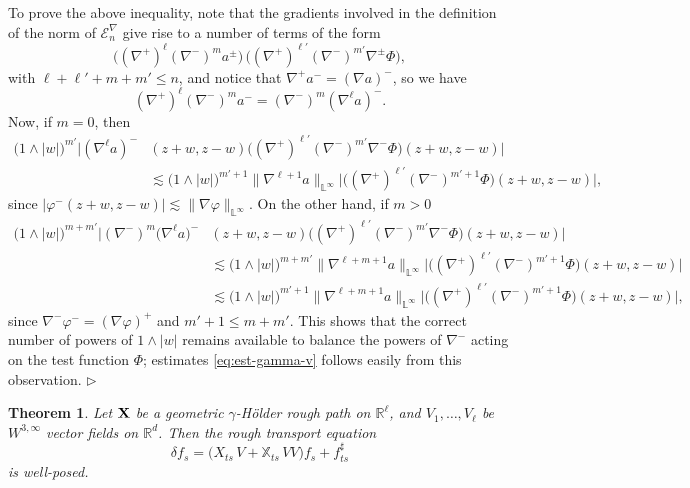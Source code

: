 \documentclass[11pt,a4paper]{amsart}
\newcommand{\RR}{\mathbb{R}}  \newcommand{\CC}{\mathbb{C}}  \newcommand{\LL}{\mathbb{L}}  \newcommand{\WW}{\mathbb{W}}
\newcommand{\mcE}{\mathcal{E}}
\newcommand{\bbX}{\mathbb{X}}
\newcommand{\ssk}{\smallskip}
\newtheorem{thm}{\hspace{-0.15cm}  {\sc Theorem} } %
\numberwithin{equation}{section} %
\newenvironment{Dem}{%
    \begin{list}{\hspace{0.5cm}{\sc Proof --}}{%
        \setlength{\topsep}{0pt}%
        \setlength{\leftmargin}{0pt}%
        \setlength{\rightmargin}{0pt}%
        \setlength{\listparindent}{0pt}%
        \setlength{\itemindent}{0pt}%
        \setlength{\parsep}{0pt}%
        \addtolength{\leftmargin}{20pt}%
        \addtolength{\rightmargin}{0pt}%
    } \item }{\hfill{\space $\rhd$}\end{list}\smallskip}
\begin{document}
\begin{Dem}
\ssk

To prove the above inequality, note that the  gradients involved in the definition of the norm of $\mcE^\nabla_n$ give rise to a number of terms of the form 
$$
\big((\nabla^+)^\ell (\nabla^-)^m a^\pm\big)\,\big((\nabla^+)^{\ell'} (\nabla^-)^{m'} \nabla^\pm\Phi\big),
$$ 
with $\ell+\ell'+m+m'\le n$, and notice that $\nabla^+ a^- = (\nabla a)^-$, so we have
$$
(\nabla^+)^\ell (\nabla^-)^m a^- = (\nabla^-)^m (\nabla^\ell a)^-.
$$
Now, if $m=0$, then
\begin{equation*}
\begin{split}
\big(1\wedge |w|\big)^{m'}\Big|(\nabla^\ell a)^-&(z+w,z-w) \big((\nabla^+)^{\ell'} (\nabla^-)^{m'} \nabla^-\Phi\big)(z+w,z-w)\Big| \\
& \lesssim \big(1\wedge |w|\big)^{m'+1} \big\|\nabla^{\ell+1} a\big\|_{\LL^\infty} \Big|\big((\nabla^+)^{\ell'} (\nabla^-)^{m'+1}\Phi\big)(z+w,z-w)\Big|,
\end{split}
\end{equation*}
since $\big|\varphi^-(z+w,z-w)\big| \lesssim \|\nabla \varphi\|_{\LL^\infty}$. On the other hand, if $m>0$
\begin{equation*}
\begin{split}
\big(1\wedge |w|\big)^{m+m'}\Big|(\nabla^-)^m\big(\nabla^\ell a\big)^- &(z+w,z-w) \big((\nabla^+)^{\ell'} (\nabla^-)^{m'} \nabla^-\Phi\big)(z+w,z-w)\Big| \\
&\lesssim \big(1\wedge |w|\big)^{m+m'} \big\|\nabla^{\ell+m+1} a\big\|_{\LL^\infty} \Big|\big((\nabla^+)^{\ell'} (\nabla^-)^{m'+1}\Phi\big)(z+w,z-w)\Big| \\
&\lesssim \big(1\wedge |w|\big)^{m'+1} \big\|\nabla^{\ell+m+1} a\big\|_{\LL^\infty} \Big|\big((\nabla^+)^{\ell'} (\nabla^-)^{m'+1}\Phi\big)(z+w,z-w)\Big|, 
\end{split}
\end{equation*}
since $\nabla^- \varphi^- = (\nabla \varphi)^+$ and $m'+1 \le m+m'$. This shows that the correct number of powers of $1\wedge |w|$ remains available to balance the powers of $\nabla^-$ acting on the test function $\Phi$; estimates \eqref{eq:est-gamma-v} follows easily from this observation.
\end{Dem}

\ssk

\begin{thm}
\label{ThmTransportL2}
Let ${\bf X}$ be a geometric $\gamma$-H\"older rough path on $\RR^\ell$, and $V_1,\dots,V_\ell$ be $W^{3,\infty}$ vector fields on $\RR^d$. Then the rough transport equation 
$$
\delta f_s = \big(X_{ts}\,V + \bbX_{ts}\,VV\big)f_s + f^\sharp_{ts}
$$ 
is well-posed.
\end{thm}
\end{document}
